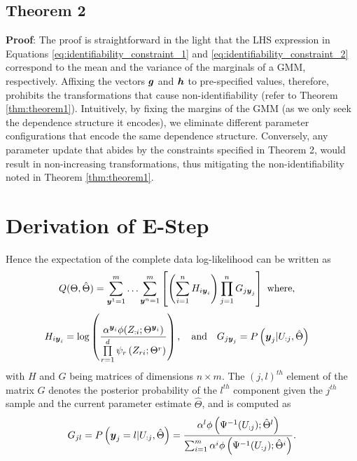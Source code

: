 \documentclass{article}
\theoremstyle{plain}
\theoremstyle{definition}
\theoremstyle{remark}
\begin{document}
\subsection{Theorem 2} \label{apd:Proof_theorem_2}
\textbf{Proof}: The proof is straightforward in the light that the LHS expression in Equations \eqref{eq:identifiability_constraint_1} and \eqref{eq:identifiability_constraint_2} correspond to the mean and the variance of the marginals of a GMM, respectively. Affixing the vectors $\boldsymbol{g}$ and $\boldsymbol{h}$ to pre-specified values, therefore, prohibits the transformations that cause non-identifiability  (refer to Theorem \ref{thm:theorem1}). Intuitively, by fixing the margins of the GMM (as we only seek the dependence structure it encodes), we eliminate different parameter configurations that encode the same dependence structure. Conversely, any parameter update that abides by the constraints specified in Theorem 2, would result in non-increasing transformations, thus mitigating the non-identifiability noted in Theorem \ref{thm:theorem1}.

\section{Derivation of E-Step}\label{apd:EStep_derivation}
Hence the expectation of the complete data log-likelihood can be written as
\begin{align} \label{eq:ll_comp_expectation}
Q(\Theta,\hat{\Theta})&=\sum\limits_{\boldsymbol{y}^1=1}^m \ldots \sum\limits_{\boldsymbol{y}^n=1}^m \left[ \left( \sum\limits_{i=1}^{n}H_{i\boldsymbol{y}_i}  \right) \prod\limits_{j=1}^{n}G_{j\boldsymbol{y}_j} \right] \text{  where,}
\end{align}
\begin{align}
H_{i\boldsymbol{y}_i} &= \log \left(\frac{\alpha^{\boldsymbol{y}_i}\phi(Z_{:i}; \Theta^{\boldsymbol{y}_i})}{\prod\limits_{r=1}^{d}\psi_{r}\left(Z_{r{i}};\Theta^r \right)} \right),\quad\text{and}\quad
G_{j\boldsymbol{y}_j} = P\left(\boldsymbol{y}_j|U_{:j},\hat{\Theta}\right) \nonumber
\end{align}
with $H$ and $G$ being matrices of dimensions $n\times m$. The $(j,l)^{th}$ element of the matrix $G$ denotes the posterior probability of the $l^{th}$ component given the $j^{th}$ sample and the current parameter estimate $\hat{\Theta}$, and is computed as
\begin{align}
G_{jl}=P\left(\boldsymbol{y}_j=l|U_{:j},\hat{\Theta}\right)=\frac{\alpha^l\phi\left(\Psi^{-1}(U_{:j}); \hat{\Theta}^l\right)}{\sum_{i=1}^m\alpha^i\phi\left(\Psi^{-1}(U_{:j}); \hat{\Theta}^i\right)}.
\end{align}
\end{document}
